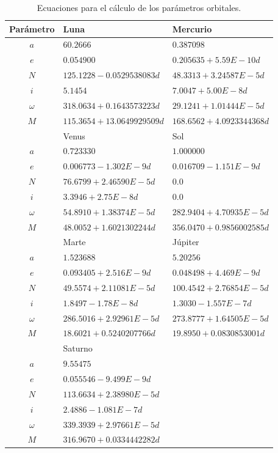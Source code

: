 \documentclass[a4paper,10pt]{article}
\begin{document}
\begin{table}
  \centering
  \begin{tabular}{cll}
    \hline
    Parámetro & Luna & Mercurio \\
    \hline
    $a     $ & $60.2666                  $  & $0.387098                $ \\
    $e     $ & $0.054900                 $  & $0.205635 + 5.59E-10d    $ \\
    $N     $ & $125.1228 - 0.0529538083d $  & $48.3313 + 3.24587E-5d   $ \\
    $i     $ & $5.1454                   $  & $7.0047 + 5.00E-8d       $ \\
    $\omega$ & $318.0634 + 0.1643573223d $  & $29.1241 + 1.01444E-5d   $ \\
    $M     $ & $115.3654 + 13.0649929509d$  & $168.6562 + 4.0923344368d$ \\
    \hline      
              & Venus & Sol \\
    $a     $ & $0.723330               $  & $1.000000                $ \\
    $e     $ & $0.006773 - 1.302E-9d   $  & $0.016709 - 1.151E-9d    $ \\
    $N     $ & $76.6799 + 2.46590E-5d  $  & $0.0                     $ \\
    $i     $ & $3.3946 + 2.75E-8d      $  & $0.0                     $ \\
    $\omega$ & $54.8910 + 1.38374E-5d  $  & $282.9404 + 4.70935E-5d  $ \\
    $M     $ & $48.0052 + 1.6021302244d$  & $356.0470 + 0.9856002585d$ \\
    \hline
              & Marte & Júpiter \\
    $a     $ & $1.523688               $  & $5.20256                $ \\
    $e     $ & $0.093405 + 2.516E-9d   $  & $0.048498 + 4.469E-9d   $ \\
    $N     $ & $49.5574 + 2.11081E-5d  $  & $100.4542 + 2.76854E-5d $ \\
    $i     $ & $1.8497 - 1.78E-8d      $  & $1.3030 - 1.557E-7d     $ \\
    $\omega$ & $286.5016 + 2.92961E-5d $  & $273.8777 + 1.64505E-5d $ \\
    $M     $ & $18.6021 + 0.5240207766d$  & $19.8950 + 0.0830853001d$ \\
    \hline
              & Saturno & \\
    $a     $ & $9.55475                 $  & $ $ \\
    $e     $ & $0.055546 - 9.499E-9d    $  & $ $ \\
    $N     $ & $113.6634 + 2.38980E-5d  $  & $ $ \\
    $i     $ & $2.4886 - 1.081E-7d      $  & $ $ \\
    $\omega$ & $339.3939 + 2.97661E-5d  $  & $ $ \\
    $M     $ & $316.9670 + 0.0334442282d$  & $ $ \\
    \hline
  \end{tabular}
  \caption{Ecuaciones para el cálculo de los parámetros orbitales. }
  \label{tab:OrbitalParams}
\end{table}
\end{document}
